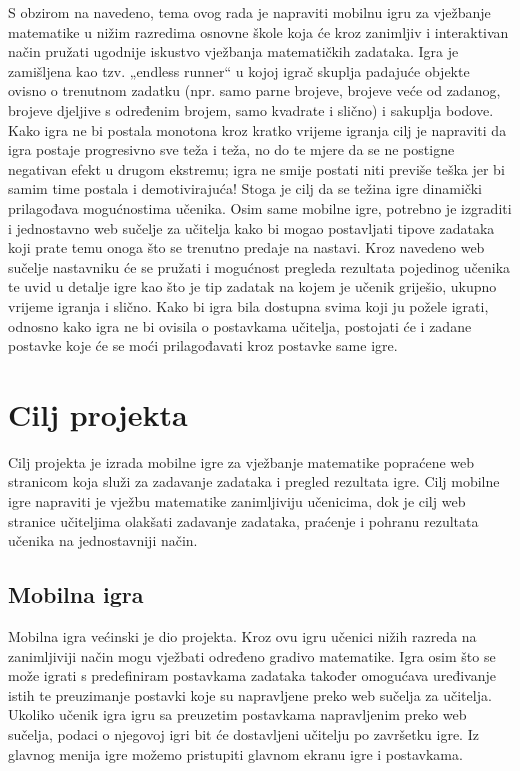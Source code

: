 \documentclass[times, utf8, zavrsni]{fer}
\begin{document}
S obzirom na navedeno, tema ovog rada je napraviti mobilnu igru za vježbanje matematike u nižim razredima osnovne škole koja će kroz zanimljiv i interaktivan način pružati  ugodnije iskustvo
vježbanja matematičkih zadataka. Igra je zamišljena kao tzv. „endless runner“ u kojoj igrač skuplja padajuće objekte ovisno o trenutnom zadatku (npr. samo parne brojeve, brojeve veće od zadanog,
brojeve djeljive s određenim brojem, samo kvadrate i slično) i sakuplja bodove. Kako igra ne bi postala monotona kroz kratko vrijeme igranja cilj je napraviti da igra postaje progresivno sve teža
i teža, no do te mjere da se ne postigne negativan efekt u drugom ekstremu; igra ne smije postati niti previše teška jer bi samim time postala i demotivirajuća! Stoga je cilj da se težina igre
dinamički prilagođava mogućnostima učenika. Osim same mobilne igre, potrebno je izgraditi i jednostavno web sučelje za učitelja kako bi mogao postavljati tipove zadataka koji prate temu onoga što
se trenutno predaje na nastavi. Kroz navedeno web sučelje nastavniku će se pružati i mogućnost pregleda rezultata pojedinog učenika te uvid u detalje igre kao što je tip zadatak na kojem je učenik 
griješio, ukupno vrijeme igranja i slično. Kako bi igra bila dostupna svima koji ju požele igrati, odnosno kako igra ne bi ovisila o postavkama učitelja, postojati će i zadane postavke koje će se moći
 prilagođavati kroz postavke same igre. 



\chapter{Cilj projekta}
Cilj projekta je izrada mobilne igre za vježbanje matematike popraćene web stranicom koja služi za zadavanje zadataka i pregled rezultata igre. Cilj mobilne igre napraviti je vježbu matematike zanimljiviju učenicima, 
dok je cilj web stranice učiteljima olakšati zadavanje zadataka, praćenje i pohranu rezultata učenika na jednostavniji način.

	\section{Mobilna igra}
	Mobilna igra većinski je dio projekta. Kroz ovu igru učenici nižih razreda na zanimljiviji način mogu vježbati određeno gradivo matematike. Igra osim što se može igrati s predefiniram postavkama zadataka također omogućava uređivanje istih
	te preuzimanje postavki koje su napravljene preko web sučelja za učitelja. Ukoliko učenik igra igru sa preuzetim postavkama napravljenim preko web sučelja, podaci o njegovoj igri bit će dostavljeni učitelju po završetku igre.
	Iz glavnog menija igre možemo pristupiti glavnom ekranu igre i postavkama.
		
\end{document}
